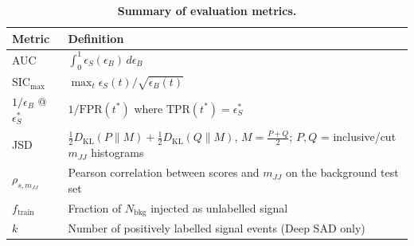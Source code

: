 \documentclass[11pt,a4paper]{article}
\newcommand{\ftrain}{f_{\mathrm{train}}}
\newcommand{\klabels}{k}
\newcommand{\eS}{\epsilon_S}
\newcommand{\eB}{\epsilon_B}
\newcommand{\mjj}{m_{JJ}}
\newcommand{\sic}{\mathrm{SIC}}
\begin{document}
\begin{table}[h]
\centering
\caption{\textbf{Summary of evaluation metrics.}}
\label{tab:metrics}
\begin{tabular}{P{2.6cm} P{10cm}}
\toprule
Metric & Definition \\
\midrule
AUC & $\int_0^1 \eS(\eB)\,d\eB$ \\[4pt]
$\sic_\mathrm{max}$ & $\max_t \eS(t)/\sqrt{\eB(t)}$ \\[4pt]
$1/\eB$ @ $\eS^*$ & $1/\mathrm{FPR}(t^*)$ where $\mathrm{TPR}(t^*)=\eS^*$ \\[4pt]
JSD & $\frac12 D_\mathrm{KL}(P\|M) + \frac12 D_\mathrm{KL}(Q\|M)$, $M{=}\frac{P+Q}{2}$; $P,Q$ = inclusive/cut $\mjj$ histograms \\[4pt]
$\rho_{s,\mjj}$ & Pearson correlation between scores and $\mjj$ on the background test set \\[4pt]
$\ftrain$ & Fraction of $N_\mathrm{bkg}$ injected as unlabelled signal \\[4pt]
$\klabels$ & Number of positively labelled signal events (Deep SAD only) \\
\bottomrule
\end{tabular}
\end{table}
\endgroup
\end{document}
